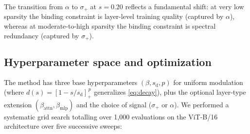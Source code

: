 \documentclass[11pt]{article}
\theoremstyle{plain}
\theoremstyle{definition}
\theoremstyle{remark}
\newcommand{\1}{\mathbf{1}}
\begin{document}
The transition from \(\alpha\) to \(\sigma_+\) at \(s=0.20\) reflects a fundamental shift: at very low sparsity the binding constraint is layer-level training quality (captured by \(\alpha\)), whereas at moderate-to-high sparsity the binding constraint is spectral redundancy (captured by \(\sigma_+\)).

\subsection{Hyperparameter space and optimization}
\label{subsec:hp_space}

The method has three base hyperparameters \((\beta, s_{\mathrm{d}}, p)\) for uniform modulation (where \(d(s) = [1-s/s_{\mathrm{d}}]_+^{\,p}\) generalizes \eqref{eq:decay}), plus the optional layer-type extension \((\beta_{\mathrm{attn}}, \beta_{\mathrm{mlp}})\) and the choice of signal (\(\sigma_+\) or \(\alpha\)).  We performed a systematic grid search totalling over 1{,}000 evaluations on the ViT-B/16 architecture over five successive sweeps:
\end{document}
